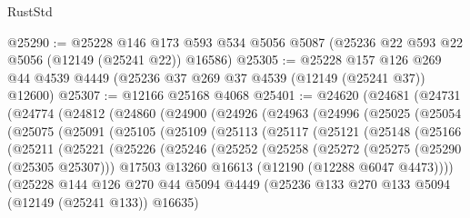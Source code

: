 \begin{lexlean}{RustStd}
\begin{coremodule}
@25290 := @25228
    @146
    @173
    @593
    @534
    @5056
    @5087
    (@25236 @22 @593 @22 @5056 (@12149 (@25241 @22)) @16586)
@25305 := @25228
    @157
    @126
    @269
    @44
    @4539
    @4449
    (@25236 @37 @269 @37 @4539 (@12149 (@25241 @37)) @12600)
@25307 := @12166 @25168 @4068
@25401 := @24620
    (@24681
      (@24731
        (@24774
          (@24812
            (@24860
              (@24900
                (@24926
                  (@24963
                    (@24996
                      (@25025
                        (@25054
                          (@25075
                            (@25091
                              (@25105
                                (@25109
                                  (@25113
                                    (@25117
                                      (@25121
                                        (@25148
                                          (@25166
                                            (@25211
                                              (@25221
                                                (@25226
                                                  (@25246
                                                    (@25252
                                                      (@25258
                                                        (@25272
                                                          (@25275 (@25290 (@25305 @25307)))
                                                          @17503
                                                          @13260
                                                          @16613
                                                          (@12190 (@12288 @6047 @4473))))
                                                      (@25228
                                                        @144
                                                        @126
                                                        @270
                                                        @44
                                                        @5094
                                                        @4449
                                                        (@25236
                                                          @133
                                                          @270
                                                          @133
                                                          @5094
                                                          (@12149 (@25241 @133))
                                                          @16635)

\end{coremodule}
\end{lexlean}
